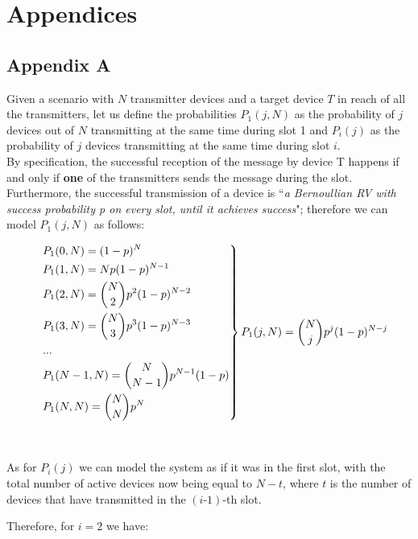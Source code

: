 \chapter{Appendices}

\section*{Appendix A}
Given a scenario with $N$ transmitter devices and a target device $T$ in reach of all the transmitters, let us define the probabilities $P_{1}(j, N)$ as the probability of $j$ devices out of $N$ transmitting at the same time during slot 1 and $P_{i}(j)$ as the probability of $j$ devices transmitting at the same time during slot $i$.\\
By specification, the successful reception of the message by device T happens if and only if \textbf{one} of the transmitters sends the message during the slot.
Furthermore, the successful transmission of a device is ``\textit{a Bernoullian RV with success probability \emph{p} on every slot, until it achieves success}"; therefore we can model $P_{1}(j, N)$ as 
follows:

\[
\begin{drcases}
    &P_{1}(0, N) = (1-p)^{N} \\
    &P_{1}(1, N) = N p(1-p)^{N-1}\\
    &P_{1}(2, N) = {N\choose2}p^{2}(1-p)^{N-2}\\
	&P_{1}(3, N) = {N\choose3}p^{3}(1-p)^{N-3}\\
	&...\\
	&P_{1}(N-1, N) = {N\choose N-1}p^{N-1}(1-p)\\
	&P_{1}(N, N) = {N\choose N}p^{N}\\
\end{drcases}
P_{1}(j, N) = {N\choose j} p^{j} (1-p)^{N-j}
\]
\\
\\
As for $P_{i}(j)$ we can model the system as if it was in the first slot, with the total number of active devices now being equal to $N-t$, where $t$ is the number of devices that have transmitted in the $(i\text{-}1)$-th slot.

Therefore, for $i=2$ we have:

